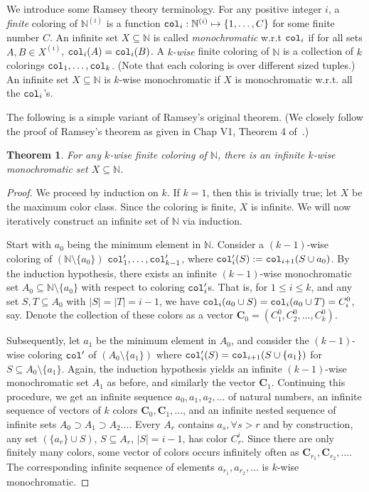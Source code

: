 \documentclass[11pt]{article}
\newtheorem{theorem}{Theorem}[section]
\newcommand{\NN}{\mathbb{N}}
\begin{document}
We introduce some Ramsey theory terminology. For any positive integer $i$, a {\em finite} coloring of $\NN^{(i)}$ is a function $\col_i:\NN^{(i)} \mapsto \{1,\ldots,C\}$
for some finite number $C$. An infinite set $X\subseteq \NN$ is called {\em monochromatic} w.r.t  ${\tt col}_i$ if for all sets $A,B \in X^{(i)}$, ${\tt col}_i(A) = {\tt col}_i(B)$. A {\em $k$-wise} finite coloring of $\NN$ is a collection of $k$ colorings
${\tt col}_1,\ldots,{\tt col}_k$. (Note that each coloring is over different sized tuples.) 
An infinite set $X\subseteq \NN$ is $k$-wise monochromatic if $X$ is monochromatic w.r.t. all the ${\tt col}_i$'s.

The following is a simple variant of Ramsey's original theorem.
(We closely follow the proof of Ramsey's theorem as given in Chap V1, Theorem 4 of~\cite{Bol00}.)




\begin{theorem} \label{thm:ramsey} For any $k$-wise  finite coloring of $\NN$,
there is an infinite $k$-wise monochromatic set $X\subseteq \NN$.
\end{theorem}
\begin{proof} We proceed by induction on $k$. If $k = 1$, then this is trivially true; let $X$ be
the maximum color class. Since the coloring is finite, $X$ is infinite.
We will now iteratively construct an infinite set of $\NN$ via induction.

Start with $a_0$ being the minimum element in $\NN$. Consider a $(k-1)$-wise coloring of $(\NN \setminus \{a_0\})$
${\tt col}'_1,\ldots,{\tt col}'_{k-1}$, where ${\tt col}'_i(S) := {\tt col}_{i+1}(S\cup a_0)$.
By the induction hypothesis, there exists an infinite $(k-1)$-wise monochromatic
set $A_0\subseteq \NN\setminus\{a_0\}$ with respect to coloring ${\tt col}'_i$s. 
That is, for $1\leq i\leq k$, and any set $S,T\subseteq A_0$ with $|S|=|T|=i-1$, we have 
${\tt col}_i(a_0\cup S)={\tt col}_i(a_0\cup T) = C^0_i$, say.
\def\C{{\mathbf C}}
Denote the collection of these colors as a vector $\C_0 = (C^0_1, C^0_2, \ldots, C^0_k)$.

 Subsequently, let $a_1$ be the minimum element in $A_0$, and consider the $(k-1)$-wise coloring ${\tt col}'$ of $(A_0 \setminus \{a_1\})$ where ${\tt col}'_i(S) = {\tt col}_{i+1}(S \cup \{a_1\})$ for $S\subseteq A_0\setminus\{a_1\}$.
Again, the induction hypothesis yields an infinite $(k-1)$-wise monochromatic set $A_1$ as before, and similarly the vector $\C_1$. 
Continuing this procedure, 
we get an infinite sequence $a_0, a_1, a_2, \ldots$ of natural numbers, an infinite sequence
of vectors of $k$ colors $\C_0, \C_1, \ldots$, and an infinite nested sequence of infinite sets $A_0 \supset A_1 \supset A_2 \ldots$.
Every $A_r$ contains $a_s, \forall s > r$ and by construction, any set $(\{a_r\} \cup S)$, $S\subseteq A_r$, $|S|=i-1$, 
has color $C^i_r$. Since there are only finitely many colors, some vector of colors occurs infinitely often as $\C_{r_1}, \C_{r_2}, \ldots$. The corresponding
infinite sequence of elements $a_{r_1}, a_{r_2}, \ldots$ is $k$-wise monochromatic.
\end{proof}
\end{document}
